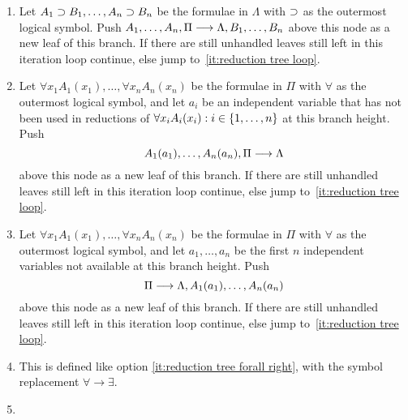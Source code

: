 \documentclass[11pt,a4paper]{article}
\begin{document}
\begin{definition}
\begin{enumerate}
\begin{enumerate}
\begin{enumerate}
                        \item\label{it:reduction tree limplies right}
                            Let \(A_1\supset B_1,\ldots,A_n\supset B_n\) be the formulae
                            in \(\Lambda\) with \(\supset\) as the outermost logical symbol.
                            Push \(A_1,\ldots,A_n,\Pi\longrightarrow\Lambda, B_1, \ldots, B_n\) above
                            this node as a new leaf of this branch.
                            If there are still unhandled leaves still left in this iteration loop
                            continue, else jump to~\ref{it:reduction tree loop}.
                        \item\label{it:reduction tree forall left}
                            Let \(\forall x_1A_1(x_1),\ldots,\forall x_nA_n(x_n)\) be the formulae
                            in \(\Pi\) with \(\forall\) as the outermost logical symbol,
                            and let \(a_i\) be an independent variable that has not been used in
                            reductions of \(\forall x_iA_i(x_i) : i \in\{1,\ldots,n\}\)
                            at this branch height.
                            Push \[A_1(a_1),\ldots,A_n(a_n),\Pi\longrightarrow\Lambda\] above
                            this node as a new leaf of this branch.
                            If there are still unhandled leaves still left in this iteration loop
                            continue, else jump to~\ref{it:reduction tree loop}.
                        \item\label{it:reduction tree forall right}
                            Let \(\forall x_1A_1(x_1),\ldots,\forall x_nA_n(x_n)\) be the formulae
                            in \(\Pi\) with \(\forall\) as the outermost logical symbol,
                            and let \(a_1,\ldots,a_n\) be the first \(n\) independent variables not available
                            at this branch height.
                            Push \[\Pi\longrightarrow\Lambda,A_1(a_1),\ldots,A_n(a_n)\] above
                            this node as a new leaf of this branch.
                            If there are still unhandled leaves still left in this iteration loop
                            continue, else jump to~\ref{it:reduction tree loop}.
                        \item\label{it:reduction tree exists left}
                            This is defined like option \ref{it:reduction tree forall right},
                            with the symbol replacement \(\forall\to\exists\).
                        \item\label{it:reduction tree exists right}

\end{enumerate}
\end{enumerate}
\end{enumerate}
\end{definition}
\end{document}
